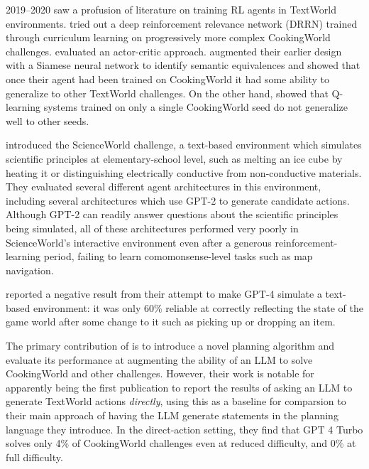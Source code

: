 \documentclass{article}
\begin{document}
2019--2020 saw a profusion of literature on training RL agents in TextWorld
environments. \autocite{Yin2020LearnCookNewRecipe} tried out a deep
reinforcement relevance network (DRRN) \autocite{He2016Deep} trained through
curriculum learning on progressively more complex CookingWorld challenges.
\autocite{Adolphs2020LeDeepChef} evaluated an actor-critic approach.
\autocite{Yin2020Zero} augmented their earlier design with a Siamese neural
network \autocite{Koch2015Siamese} to identify semantic equivalences and showed
that once their agent had been trained on CookingWorld it had some ability to
generalize to other TextWorld challenges. On the other hand,
\autocite{Chaudhury2020Bootstrapped} showed that Q-learning systems trained on
only a single CookingWorld seed do not generalize well to other seeds.

\autocite{Wang2022ScienceWorldIY} introduced the ScienceWorld challenge, a
text-based environment which simulates scientific principles at
elementary-school level, such as melting an ice cube by heating it or
distinguishing electrically conductive from non-conductive materials. They
evaluated several different agent architectures in this environment, including
several architectures which use GPT-2 \autocite{Radford2019Language} to generate
candidate actions. Although GPT-2 can readily answer questions about the
scientific principles being simulated, all of these architectures performed very
poorly in ScienceWorld's interactive environment even after a generous
reinforcement-learning period, failing to learn comomonsense-level tasks such as
map navigation.

\autocite{Wang2024CanLM} reported a negative result from their attempt to make
GPT-4 \autocite{Achiam2023Gpt} simulate a text-based environment: it was only
60\% reliable at correctly reflecting the state of the game world after some
change to it such as picking up or dropping an item.

The primary contribution of \autocite{Zhang2024PDDLEGOIP} is to introduce a
novel planning algorithm and evaluate its performance at augmenting the ability
of an LLM to solve CookingWorld and other challenges. However, their work is
notable for apparently being the first publication to report the results of
asking an LLM to generate TextWorld actions \textit{directly}, using this as a
baseline for comparsion to their main approach of having the LLM generate
statements in the planning language they introduce. In the direct-action
setting, they find that GPT 4 Turbo solves only 4\% of CookingWorld challenges
even at reduced difficulty, and 0\% at full difficulty.
\end{document}
